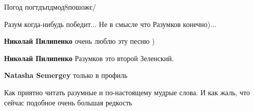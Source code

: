 \begin{itemize}
\begin{itemize}
Погод погтдъпдмод8пошожє/

\end{itemize}

 
Разум когда-нибудь победит... Не в смысле что Разумков конечно)...

\begin{itemize}
 
\textbf{Николай Пилипенко} очень люблю эту песню )

 
\textbf{Николай Пилипенко} Разумков это второй Зеленский.

 
\textbf{Natasha Semergey} только в профиль
\end{itemize}

 

Как приятно читать разумные и по-настоящему мудрые слова. И как жаль, что
сейчас подобное очень большая редкость

\begin{itemize}
 

\end{itemize}
\end{itemize}
